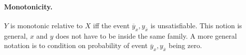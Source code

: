\documentclass[11pt]{article}
\begin{document}
\paragraph{Monotonicity.} $Y$ is monotonic relative to $X$ iff the event $\overbar y _ x, y_{\overbar x}$ is unsatisfiable. This notion is general, $x$ and $y$ does not have to be inside the same family. A more general notation is to condition on probability of event $\overbar y _ x, y_{\overbar x}$ being zero. 
\end{document}

